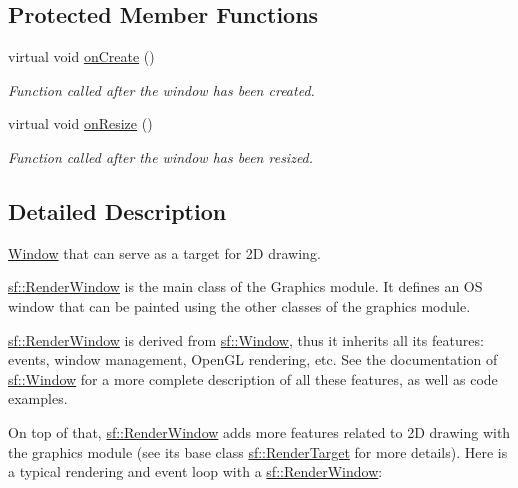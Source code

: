 \subsection*{Protected Member Functions}
\begin{DoxyCompactItemize}
\item 
virtual void \hyperlink{classsf_1_1RenderWindow_a5bef0040b0fa87bed9fbd459c980d53a}{on\-Create} ()
\begin{DoxyCompactList}\small\item\em Function called after the window has been created. \end{DoxyCompactList}\item 
virtual void \hyperlink{classsf_1_1RenderWindow_a5c85fe482313562d33ffd24a194b6fef}{on\-Resize} ()
\begin{DoxyCompactList}\small\item\em Function called after the window has been resized. \end{DoxyCompactList}\end{DoxyCompactItemize}


\subsection{Detailed Description}
\hyperlink{classsf_1_1Window}{Window} that can serve as a target for 2\-D drawing. 

\hyperlink{classsf_1_1RenderWindow}{sf\-::\-Render\-Window} is the main class of the Graphics module. It defines an O\-S window that can be painted using the other classes of the graphics module.

\hyperlink{classsf_1_1RenderWindow}{sf\-::\-Render\-Window} is derived from \hyperlink{classsf_1_1Window}{sf\-::\-Window}, thus it inherits all its features\-: events, window management, Open\-G\-L rendering, etc. See the documentation of \hyperlink{classsf_1_1Window}{sf\-::\-Window} for a more complete description of all these features, as well as code examples.

On top of that, \hyperlink{classsf_1_1RenderWindow}{sf\-::\-Render\-Window} adds more features related to 2\-D drawing with the graphics module (see its base class \hyperlink{classsf_1_1RenderTarget}{sf\-::\-Render\-Target} for more details). Here is a typical rendering and event loop with a \hyperlink{classsf_1_1RenderWindow}{sf\-::\-Render\-Window}\-:


